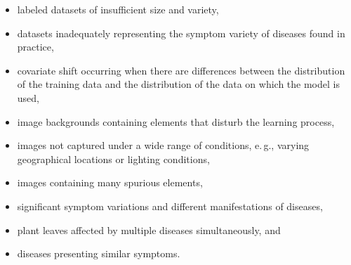 \documentclass{BachelorBUI}
\newcommand{\eg}{\mbox{e.\,g.}\xspace}
\begin{document}
\begin{itemize}
    \item labeled datasets of insufficient size and variety,
    \item datasets inadequately representing the symptom variety of diseases found in practice,
    \item covariate shift occurring when there are differences between the distribution of the training data and the distribution of the data on which the model is used,
    \item image backgrounds containing elements that disturb the learning process,
    \item images not captured under a wide range of conditions, \eg, varying geographical locations or lighting conditions,
    \item images containing many spurious elements,
    \item significant symptom variations and different manifestations of diseases,
    \item plant leaves affected by multiple diseases simultaneously, and
    \item diseases presenting similar symptoms.
\end{itemize}
\end{document}
